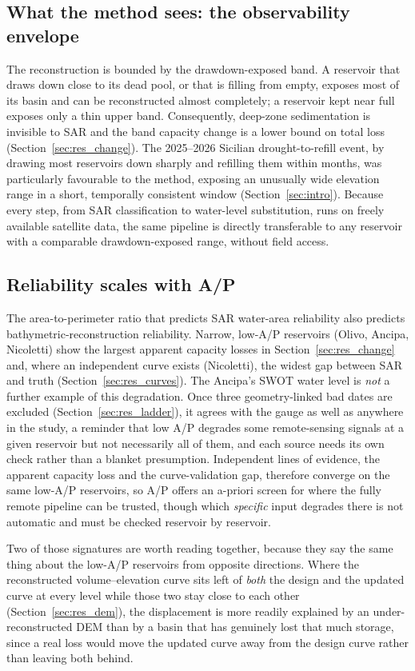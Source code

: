 \subsection{What the method sees: the observability envelope}
The reconstruction is bounded by the drawdown-exposed band. A reservoir that draws
down close to its dead pool, or that is filling from empty, exposes most of its basin
and can be reconstructed almost completely; a reservoir kept near full exposes only a
thin upper band. Consequently, deep-zone sedimentation is invisible to SAR and the
band capacity change is a lower bound on total loss (Section~\ref{sec:res_change}).
The 2025--2026 Sicilian drought-to-refill event, by drawing most reservoirs down
sharply and refilling them within months, was particularly favourable to the method,
exposing an unusually wide elevation range in a short, temporally consistent window
(Section~\ref{sec:intro}). Because every step, from SAR classification to
water-level substitution, runs on freely available satellite data, the same pipeline
is directly transferable to any reservoir with a comparable drawdown-exposed range,
without field access.

\subsection{Reliability scales with A/P}
The area-to-perimeter ratio that predicts SAR water-area reliability
\citep{PaperOne} also predicts bathymetric-reconstruction reliability. Narrow,
low-A/P reservoirs (Olivo, Ancipa, Nicoletti) show the largest apparent capacity
losses in Section~\ref{sec:res_change} and, where an independent curve exists
(Nicoletti), the widest gap between SAR and truth (Section~\ref{sec:res_curves}). The
Ancipa's SWOT water level is \emph{not} a further example of this degradation.
Once three geometry-linked bad dates are excluded (Section~\ref{sec:res_ladder}), it
agrees with the gauge as well as anywhere in the study, a reminder that low A/P
degrades some remote-sensing signals at a given reservoir but not necessarily all of
them, and each source needs its own check rather than a blanket presumption.
Independent lines of evidence, the apparent capacity loss and the curve-validation gap,
therefore converge on the same low-A/P reservoirs, so A/P offers an a-priori screen for
where the fully remote pipeline can be trusted, though which \emph{specific} input
degrades there is not automatic and must be checked reservoir by reservoir.

Two of those signatures are worth reading together, because they say the same thing
about the low-A/P reservoirs from opposite directions. Where the reconstructed
volume--elevation curve sits left of \emph{both} the design and the updated curve at
every level while those two stay close to each other (Section~\ref{sec:res_dem}), the
displacement is more readily explained by an under-reconstructed DEM than by a basin
that has genuinely lost that much storage, since a real loss would move the updated
curve away from the design curve rather than leaving both behind.

